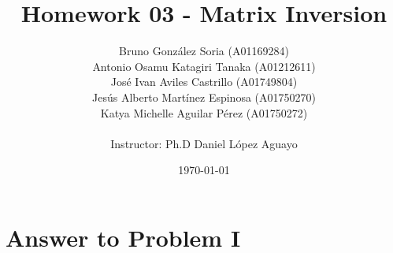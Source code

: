 \documentclass[11pt,a4paper]{article}
\title
{
    Homework 03 - Matrix Inversion
}
\author
{    
    Bruno Gonz{\' a}lez Soria (A01169284)  \\
    Antonio Osamu Katagiri Tanaka (A01212611) \\
    Jos{\' e} Ivan Aviles Castrillo (A01749804) \\
    Jes{\' u}s Alberto Mart{\' i}nez Espinosa (A01750270) \\
    Katya Michelle Aguilar P{\' e}rez (A01750272) \\
    \\
    Instructor: Ph.D Daniel L{\' o}pez Aguayo
}
\date{\today}
\providecommand{\keywords}[1]
{
    \\
    \\
    \small
    \textbf{\textit{Keywords:}} #1
}
\begin{document}
\setlength\parindent{0pt} %


\maketitle


\clearpage








\section{Answer to Problem I}\label{sec:P01}



\clearpage
\end{document}

